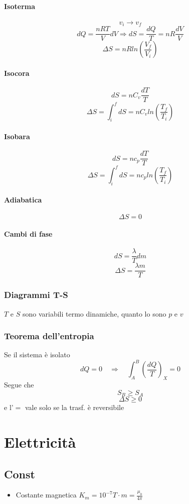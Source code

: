 \documentclass[a4paper]{report}
\begin{document}
  \subsubsection{Isoterma}
  \[ v_i \rightarrow v_f\]
  \[ dQ = \frac{nRT}{V} dV \Rightarrow dS = \frac{dQ}{T} = nR\frac{dV}{V} \]
  \[ \Delta S = nR ln(\frac{V_f}{V_i}) \]

  \subsubsection{Isocora}
  \[ dS = nC_v\frac{dT}{T} \]
  \[ \Delta S = \int_i^f dS = nC_v ln(\frac{T_f}{T_i}) \]

  \subsubsection{Isobara}
  \[ dS = nc_p\frac{dT}{T} \]
  \[ \Delta S = \int_i^f dS = n c_p ln(\frac{T_f}{T_i})\]

  \subsubsection{Adiabatica}
  \[ \Delta S = 0 \]

  \subsubsection{Cambi di fase}
  \[ dS = \frac{\lambda}{T} dm\]
  \[ \Delta S = \frac{\lambda m}{T} \]

  \subsection{Diagrammi T-S}
  $T$ e $S$ sono variabili termo dinamiche, quanto lo sono $p$ e $v$
  \subsection{Teorema dell'entropia}
  Se il sistema è isolato
  \[ dQ = 0 \quad \Rightarrow \quad \int_A^B(\frac{dQ}{T})_X = 0\]
  Segue che
  \[ S_B \geq S_A \]
  \[ \Delta S \geq 0 \]
  e l'$=$ vale solo se la trasf. è reversibile

  \chapter{Elettricità}
  \section{Const}
  \begin{itemize}
    \item Costante magnetica $K_m = 10^{-7} T\cdot m = \frac{\mu_0}{4\pi}$
  \end{itemize}
\end{document}
